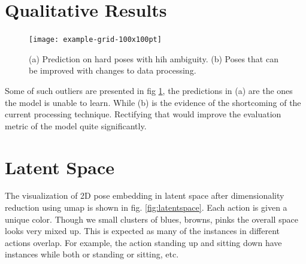 \section{Qualitative Results}




% 

\begin{figure}[h]
    \centering
    \texttt{[image: example-grid-100x100pt]}
    \caption{(a) Prediction on hard poses with hih ambiguity. (b) Poses that can be improved with changes to data processing.}
    \label{fig:bad_samples}
\end{figure}



Some of such outliers are presented in fig \ref{fig:bad_samples}, the predictions in (a) are the ones the model is unable to learn. While (b) is the evidence of the shortcoming of the current processing technique. Rectifying that would improve the evaluation metric of the model quite significantly.



\section{Latent Space}


% 


The visualization of 2D pose embedding in latent space after dimensionality reduction using \ac{umap} is shown in fig. \ref{fig:latentspace}. Each action is given a unique color. Though we small clusters of blues, browns, pinks the overall space looks very mixed up. This is expected as many of the instances in different actions overlap. For example, the action standing up and sitting down have instances while both or standing or sitting, etc.



